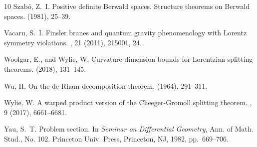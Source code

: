 \documentclass[a4paper,11pt]{article}
\numberwithin{equation}{section}
\theoremstyle{definition}
\theoremstyle{plain}
\begin{document}
\begin{thebibliography}{10}
	{\sc Szab{\'o}, Z.~I.}
	\newblock Positive definite {Berwald} spaces. {Structure} theorems on {Berwald}
	spaces.
	 (1981), 25--39.
	
	{\sc Vacaru, S.~I.}
	\newblock Finsler branes and quantum gravity phenomenology with {L}orentz
	symmetry violations.
	, 21 (2011), 215001, 24.
	
	{\sc Woolgar, E., and Wylie, W.}
	\newblock Curvature-dimension bounds for {L}orentzian splitting theorems.
	 (2018), 131--145.
	
	{\sc Wu, H.}
	\newblock On the de {R}ham decomposition theorem.
	 (1964), 291--311.
	
	{\sc Wylie, W.}
	\newblock A warped product version of the {C}heeger-{G}romoll splitting
	theorem.
	, 9 (2017), 6661--6681.
	
	{\sc Yau, S.~T.}
	\newblock Problem section.
	\newblock In {\em Seminar on {D}ifferential {G}eometry}, Ann. of Math. Stud.,
	No. 102. Princeton Univ. Press, Princeton, NJ, 1982, pp.~669--706.
	
\end{thebibliography}
\end{document}
